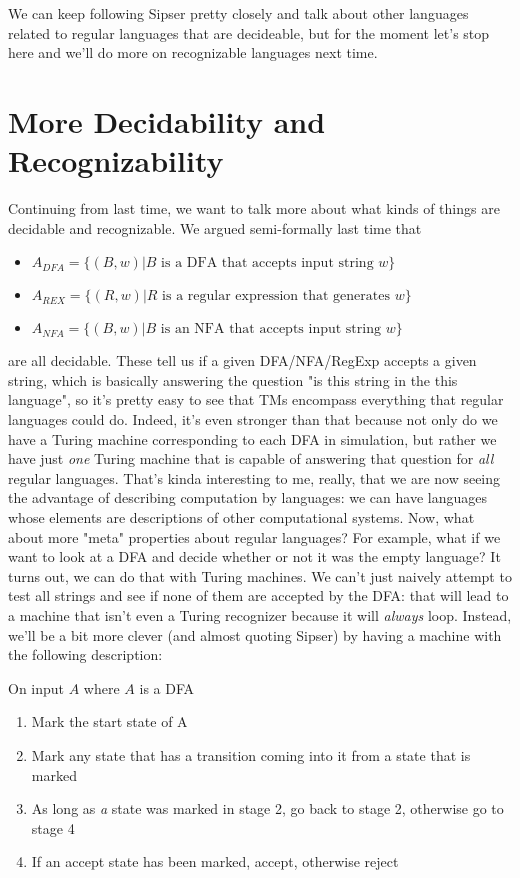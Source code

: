 \documentclass[11pt]{article}
\begin{document}
We can keep following Sipser pretty closely and talk about other languages related to regular languages that are decideable, but for the moment let's stop here and we'll do more on recognizable languages next time.

\section{More Decidability and Recognizability}
\label{sec-14}
Continuing from last time, we want to talk more about what kinds of things are decidable and recognizable. We argued semi-formally last time that 

\begin{itemize}
\item $A_{DFA} = \{(B,w)| B \text{ is a DFA that accepts input string } w\}$
\item $A_{REX} = \{(R,w) | R \text{ is a regular expression that generates } w\}$
\item $A_{NFA} = \{(B,w) | B \text{ is an NFA that accepts input string } w\}$
\end{itemize}

are all decidable. These tell us if a given DFA/NFA/RegExp accepts a given string, which is basically answering the question "is this string in the this language", so it's pretty easy to see that TMs encompass everything that regular languages could do. Indeed, it's even stronger than that because not only do we have a Turing machine corresponding to each DFA in simulation, but rather we have just \emph{one} Turing machine that is capable of answering that question for \emph{all} regular languages. That's kinda interesting to me, really, that we are now seeing the advantage of describing computation by languages: we can have languages whose elements are descriptions of other computational systems. Now, what about more "meta" properties about regular languages? For example, what if we want to look at a DFA and decide whether or not it was the empty language? It turns out, we can do that with Turing machines. We can't just naively attempt to test all strings and see if none of them are accepted by the DFA: that will lead to a machine that isn't even a Turing recognizer because it will \emph{always} loop. Instead, we'll be a bit more clever (and almost quoting Sipser) by having a machine with the following description:

On input $A$ where $A$ is a DFA

\begin{enumerate}
\item Mark the start state of A
\item Mark any state that has a transition coming into it from a state that is marked
\item As long as \emph{a} state was marked in stage 2, go back to stage 2, otherwise go to stage 4
\item If an accept state has been marked, accept, otherwise reject
\end{enumerate}
\end{document}

